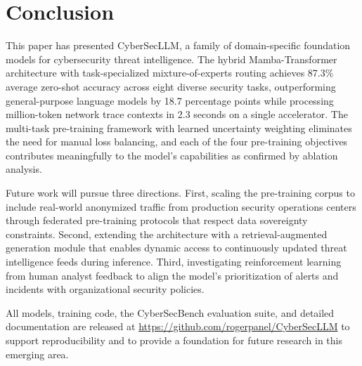 \documentclass[journal]{IEEEtran}
\newcommand{\modelname}{CyberSecLLM}
\newcommand{\benchname}{CyberSecBench}
\begin{document}
\section{Conclusion}
\label{sec:conclusion}

This paper has presented \modelname{}, a family of domain-specific foundation models for cybersecurity threat intelligence. The hybrid Mamba-Transformer architecture with task-specialized mixture-of-experts routing achieves 87.3\% average zero-shot accuracy across eight diverse security tasks, outperforming general-purpose language models by 18.7 percentage points while processing million-token network trace contexts in 2.3 seconds on a single accelerator. The multi-task pre-training framework with learned uncertainty weighting eliminates the need for manual loss balancing, and each of the four pre-training objectives contributes meaningfully to the model's capabilities as confirmed by ablation analysis.

Future work will pursue three directions. First, scaling the pre-training corpus to include real-world anonymized traffic from production security operations centers through federated pre-training protocols that respect data sovereignty constraints. Second, extending the architecture with a retrieval-augmented generation module that enables dynamic access to continuously updated threat intelligence feeds during inference. Third, investigating reinforcement learning from human analyst feedback to align the model's prioritization of alerts and incidents with organizational security policies.

All models, training code, the \benchname{} evaluation suite, and detailed documentation are released at \url{https://github.com/rogerpanel/CyberSecLLM} to support reproducibility and to provide a foundation for future research in this emerging area.
\end{document}
